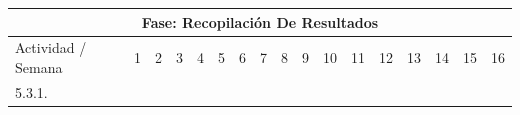 \documentclass[12pt]{article}
\begin{document}
\begin{table}[H]
{\begin{tabular}{|lllllllllllllllll|}
			\multicolumn{17}{|c|}{\cellcolor[HTML]{FFFFC7}Fase: Recopilación De Resultados}                                                                                                                                                                                                                                                                                                                                                                                                                                                                                                                                                                                                                                                                                                                                                                                                      \\ \hline
			\multicolumn{1}{|l|}{\cellcolor[HTML]{FFFFC7}Actividad / Semana}                   & \multicolumn{1}{l|}{\cellcolor[HTML]{9AFF99}1} & \multicolumn{1}{l|}{\cellcolor[HTML]{9AFF99}2} & \multicolumn{1}{l|}{\cellcolor[HTML]{9AFF99}3} & \multicolumn{1}{l|}{\cellcolor[HTML]{9AFF99}4} & \multicolumn{1}{l|}{\cellcolor[HTML]{96FFFB}5} & \multicolumn{1}{l|}{\cellcolor[HTML]{96FFFB}6} & \multicolumn{1}{l|}{\cellcolor[HTML]{96FFFB}7} & \multicolumn{1}{l|}{\cellcolor[HTML]{96FFFB}8} & \multicolumn{1}{l|}{\cellcolor[HTML]{CBCEFB}9} & \multicolumn{1}{l|}{\cellcolor[HTML]{CBCEFB}10} & \multicolumn{1}{l|}{\cellcolor[HTML]{CBCEFB}11} & \multicolumn{1}{l|}{\cellcolor[HTML]{CBCEFB}12} & \multicolumn{1}{l|}{\cellcolor[HTML]{FFCCC9}13} & \multicolumn{1}{l|}{\cellcolor[HTML]{FFCCC9}14} & \multicolumn{1}{l|}{\cellcolor[HTML]{FFCCC9}15} & \cellcolor[HTML]{FFCCC9}16 \\ \hline
			\multicolumn{1}{|l|}{5.3.1.}                                                       & \multicolumn{1}{l|}{}                          & \multicolumn{1}{l|}{}                          & \multicolumn{1}{l|}{}                          & \multicolumn{1}{l|}{}                          & \multicolumn{1}{l|}{}                          & \multicolumn{1}{l|}{}                          & \multicolumn{1}{l|}{}                          & \multicolumn{1}{l|}{}                          & \multicolumn{1}{l|}{}                          & \multicolumn{1}{l|}{}                           & \multicolumn{1}{l|}{}                           & \multicolumn{1}{l|}{}                           & \multicolumn{1}{l|}{}                           & \multicolumn{1}{l|}{}                           & \multicolumn{1}{l|}{\cellcolor[HTML]{FFCCC9}}   &                            \\ \hline

\end{tabular}}
\end{table}
\end{document}
